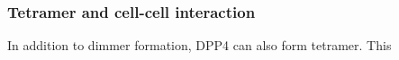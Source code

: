 \subsubsection{Tetramer and cell-cell interaction}

In addition to dimmer formation, DPP4 can also form tetramer. This 